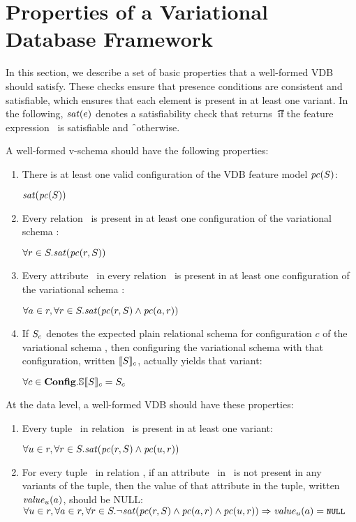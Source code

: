 \section{Properties of a Variational Database Framework}
\label{sec:vdbfprop}


In this section, we describe a set of basic properties that a well-formed VDB
should satisfy.
%
These checks ensure that presence conditions are consistent and satisfiable,
which ensures that each element is present in at least one variant.
%
In the following, $\sat\dimMeta$ denotes a satisfiability check
that returns \t\ if the feature expression \dimMeta\ is satisfiable and \f\
otherwise.


A well-formed v-schema should have the following properties:
%
\begin{enumerate}
%
\item There is at least one valid configuration of the VDB feature model $\getPC \vSch$:\\
%
\centerline{
$\sat {\getPC \vSch}$}
%
\item Every relation \vRel\ is present in at least one configuration of the
variational schema \vSch:\\
%
\centerline{
$\forall\vRel\in\vSch. \sat{\getPCfrom \vRel \vSch}$}
%
\item Every attribute \vAtt\ in every relation \vRel\ is present in at least one
configuration of the variational schema \vSch:\\
%
\centerline{
$\forall\vAtt\in\vRel, \forall\vRel\in\vSch.
\sat{\getPCfrom \vRel \vSch \wedge\getPCfrom \vAtt \vRel}$}
%
\item If $\vSch_\config$ denotes the expected plain relational schema for
configuration $c$ of the variational schema \vSch, then configuring the
variational schema with that configuration, written $\sem[\config]{\vSch}$,
actually yields that variant:\\
%
\centerline{
$\forall\config\in\confSet. \osSem {\vSch} = \vSch_\config$}
%
\end{enumerate}


\noindent
%
At the data level, a well-formed VDB should have these properties:
%
\begin{enumerate}
%
\item Every tuple \vTuple\ in relation \vRel\ is present in at least one variant:\\
%
\centerline{
$\forall\vTuple\in\vRel, \forall\vRel\in\vSch.
\sat{\getPCfrom\vRel \vSch\wedge\getPCfrom \vTuple \vRel}$ }
%
\item For every tuple \vTuple\ in relation \vRel, if an attribute \vAtt\ in \vRel\ is
not present in any variants of the tuple, then the value of that attribute in
the tuple, written $\mathit{value}_\vTuple(\vAtt)$, should be NULL:\\
$\forall\vTuple\in\vRel, \forall\vAtt\in\vRel,\forall \vRel\in\vSch.
\neg\sat{\getPCfrom \vRel \vSch \wedge\getPCfrom \vAtt \vRel\wedge\getPCfrom \vTuple \vRel}
\Rightarrow \mathit{value}_\vTuple(\vAtt) = \nul$
%
\end{enumerate}


